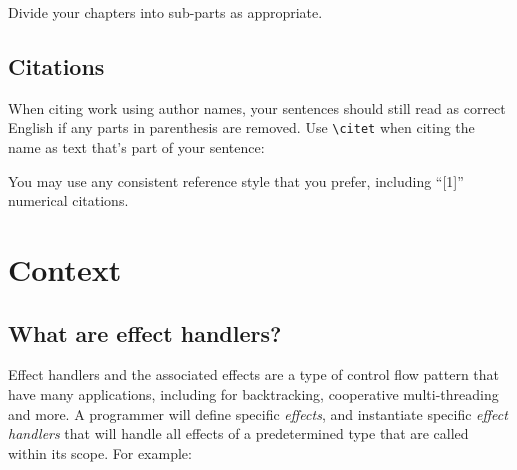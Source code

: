 \documentclass[logo,bsc,singlespacing,parskip,online]{infthesis}
\begin{document}
Divide your chapters into sub-parts as appropriate.

\section{Citations}

When citing work using author names, your sentences should still read
as correct English if any parts in parenthesis are removed.
Use {\tt {\textbackslash}citet} when citing the name as text that's part of your sentence: 

You may use any consistent reference style that you prefer, including ``[1]'' numerical citations. 








\chapter{Context}

\section{What are effect handlers?}
Effect handlers and the associated effects are a type of control flow pattern that have many applications, including for backtracking, cooperative multi-threading and more.\cite{effect_handlers_tutorial} A programmer will define specific \textit{effects}, and instantiate specific \textit{effect handlers} that will handle all effects of a predetermined type that are called within its scope. For example: 
\end{document}
